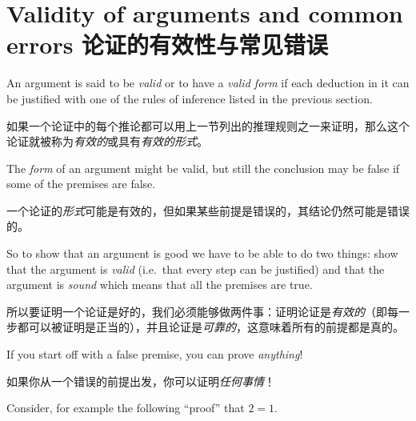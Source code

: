 \newpage




\newpage

\section{Validity of arguments and common errors 论证的有效性与常见错误}
\label{sec:valid}

An argument is said to be \emph{valid} or to have a 
\emph{valid form} 
if each deduction in it can be justified with one of the rules
of inference listed in the previous section.

如果一个论证中的每个推论都可以用上一节列出的推理规则之一来证明，那么这个论证就被称为\emph{有效的}或具有\emph{有效的形式}。

The \emph{form} of 
an argument might be valid, but still the conclusion may be false
if some of the premises are false.

一个论证的\emph{形式}可能是有效的，但如果某些前提是错误的，其结论仍然可能是错误的。

So to show that an argument is
good we have to be able to do two things: show that the argument 
is \emph{valid} (i.e.\ that every step can be justified) and that 
the argument is 
\emph{sound} 
which means that all the premises are
true.

所以要证明一个论证是好的，我们必须能够做两件事：证明论证是\emph{有效的}（即每一步都可以被证明是正当的），并且论证是\emph{可靠的}，这意味着所有的前提都是真的。

If you start off with a false premise, you can prove \emph{anything}!

如果你从一个错误的前提出发，你可以证明\emph{任何事情}！

Consider, for example the following ``proof'' that $2=1$.

